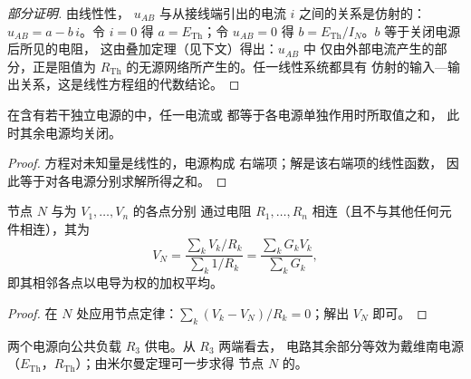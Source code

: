 \begin{proof}[部分证明]
由线性性， $u_{AB}$ 与从接线端引出的电流
$i$ 之间的关系是仿射的：$u_{AB} = a - b\,i$。令
$i = 0$ 得 $a = E_{\mathrm{Th}}$；令 $u_{AB} = 0$ 得
$b = E_{\mathrm{Th}}/I_N$。$b$ 等于关闭电源后所见的电阻，
这由叠加定理（见下文）得出：$u_{AB}$ 中
仅由外部电流产生的部分，正是阻值为
$R_{\mathrm{Th}}$ 的无源网络所产生的。任一线性系统都具有
仿射的输入—输出关系，这是线性方程组的代数结论。
\end{proof}

\begin{theorem}[叠加定理]\label{thm:b1:dc-circuits:superposition}
在含有若干独立电源的中，任一电流或
都等于各电源单独作用时所取值之和，
此时其余电源均关闭。
\end{theorem}

\begin{proof}
方程对未知量是线性的，电源构成
右端项；解是该右端项的线性函数，
因此等于对各电源分别求解所得之和。
\end{proof}

\begin{proposition}[米尔曼定理]\label{prop:b1:dc-circuits:millman}
节点 $N$ 与为 $V_1, \dots, V_n$ 的各点分别
通过电阻 $R_1, \dots, R_n$ 相连（且不与其他任何元件相连），其为
\[
V_N = \frac{\sum_k V_k/R_k}{\sum_k 1/R_k} = \frac{\sum_k G_k V_k}{\sum_k G_k},
\]
即其相邻各点以电导为权的加权平均。
\end{proposition}

\begin{proof}
在 $N$ 处应用节点定律：$\sum_k (V_k - V_N)/R_k = 0$；解出 $V_N$ 即可。
\end{proof}

\begin{omfigure}

{\small 两个电源向公共负载 $R_3$ 供电。从 $R_3$ 两端看去，
电路其余部分等效为戴维南电源
（$E_{\mathrm{Th}}$，$R_{\mathrm{Th}}$）；由米尔曼定理可一步求得
节点 $N$ 的。}
\end{omfigure}

